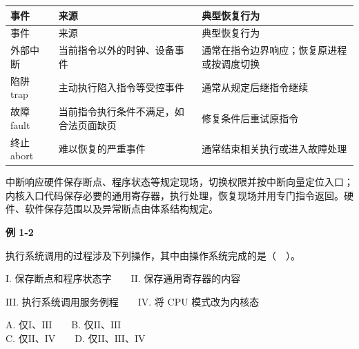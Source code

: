 \par\smallskip
\begin{wideblock}
{\fontsize{9.3}{12}\selectfont\setlength{\tabcolsep}{2.5pt}\setlength{\LTleft}{0pt}\setlength{\LTright}{0pt}
\begin{longtable}{@{}>{\raggedright\arraybackslash}p{}>{\raggedright\arraybackslash}p{}>{\raggedright\arraybackslash}p{}@{}}
\toprule
事件 & 来源 & 典型恢复行为 \\

\midrule\endfirsthead\toprule
事件 & 来源 & 典型恢复行为 \\

\midrule\endhead\bottomrule\endfoot
外部中断 & 当前指令以外的时钟、设备事件 & 通常在指令边界响应；恢复原进程或按调度切换 \\

陷阱 trap & 主动执行陷入指令等受控事件 & 通常从规定后继指令继续 \\

故障 fault & 当前指令执行条件不满足，如合法页面缺页 & 修复条件后重试原指令 \\

终止 abort & 难以恢复的严重事件 & 通常结束相关执行或进入故障处理 \\

\end{longtable}}
\end{wideblock}
\par\smallskip

中断响应硬件保存断点、程序状态等规定现场，切换权限并按中断向量定位入口；内核入口代码保存必要的通用寄存器，执行处理，恢复现场并用专门指令返回。硬件、软件保存范围以及异常断点由体系结构规定。

\par\medskip{}\noindent\hypertarget{OS01-E02}{}\label{OS01-E02}\textbf{例 1-2}\par\nobreak\smallskip

执行系统调用的过程涉及下列操作，其中由操作系统完成的是（　）。

\ensuremath{\mathrm{I}}. 保存断点和程序状态字　　\ensuremath{\mathrm{II}}. 保存通用寄存器的内容

\ensuremath{\mathrm{III}}. 执行系统调用服务例程　　\ensuremath{\mathrm{IV}}. 将 CPU 模式改为内核态

A. 仅\ensuremath{\mathrm{I}}、\ensuremath{\mathrm{III}}　　B. 仅\ensuremath{\mathrm{II}}、\ensuremath{\mathrm{III}}\\
C. 仅\ensuremath{\mathrm{II}}、\ensuremath{\mathrm{IV}}　　D. 仅\ensuremath{\mathrm{II}}、\ensuremath{\mathrm{III}}、\ensuremath{\mathrm{IV}}

